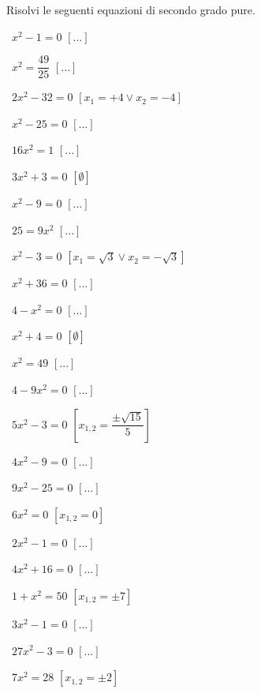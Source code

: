 \begin{esercizio}[\Ast]
 \label{ese:3.1}
Risolvi le seguenti equazioni di secondo grado pure.
\begin{multicols}{2}
 \begin{enumeratea}
 \item~$x^{2}-1 = 0$ \hfill$\left[...\right]$
 \item~$x^{2}=\dfrac{49}{25}$ \hfill$\left[...\right]$
 \item~$2x^{2} - 32 = 0$ \hfill$\left[x_{1}=+4 \vee x_{2}=-4\right]$
 \item~$x^{2}-25=0$ \hfill$\left[...\right]$
 \item~$16 x^{2}=1$ \hfill$\left[...\right]$
 \item~$3x^{2}+3=0$ \hfill$\left[\emptyset\right]$
 \item~$x^{2}-9=0$ \hfill$\left[...\right]$
 \item~$25=9 x^{2}$ \hfill$\left[...\right]$
 \item~$x^{2} - 3 = 0$ \hfill$\left[x_{1} = \sqrt{3} \vee x _{2} = - 
\sqrt{3}\right]$
 \item~$x^{2} + 36 = 0$ \hfill$\left[...\right]$
 \item~$4 - x^{2} = 0$ \hfill$\left[...\right]$
 \item~$x^{2} + 4 = 0$ \hfill$\left[\emptyset\right]$
 \item~$x^{2} = 49$ \hfill$\left[...\right]$
 \item~$4 - 9 x^{2} = 0$ \hfill$\left[...\right]$
 \item~$5 x^{2} - 3 = 0$ \hfill$\left[x_{1,2} = \dfrac{\pm 
\sqrt{15}}{5}\right]$
 \item~$4 x^{2} - 9 = 0$ \hfill$\left[...\right]$
 \item~$9 x^{2} - 25 = 0$ \hfill$\left[...\right]$
 \item~$6 x^{2} = 0$ \hfill$\left[x_{1,2} = 0\right]$
 \item~$2 x^{2} - 1 = 0$ \hfill$\left[...\right]$
 \item~$4 x^{2} + 16 = 0$ \hfill$\left[...\right]$
 \item~$1 + x^{2} = 50$ \hfill$\left[x_{1,2} = \pm 7\right]$
 \item~$3 x^{2} - 1 = 0$ \hfill$\left[...\right]$
 \item~$27 x^{2} - 3 = 0$ \hfill$\left[...\right]$
 \item~$7 x^{2} = 28$ \hfill$\left[x_{1,2} = \pm 2\right]$
 \end{enumeratea}
 \end{multicols}
\end{esercizio}

